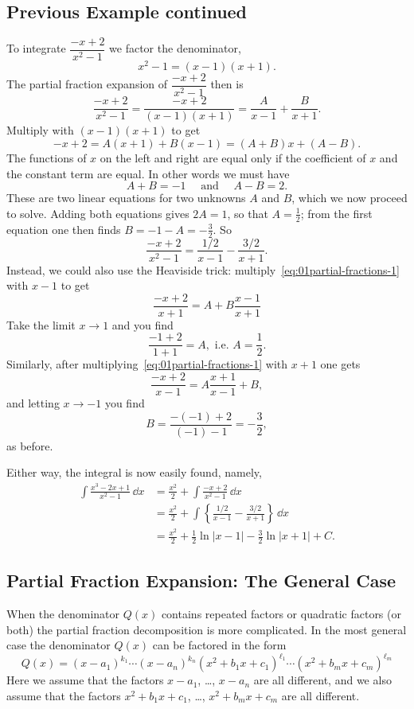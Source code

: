 \subsection{Previous Example continued} %
To integrate $\dfrac{-x+2}{x^2-1}$ we factor the denominator,
\[
x^2 -1 = (x-1) (x+1).
\]
The partial fraction expansion of $\dfrac{-x+2}{x^2-1}$ then is
\begin{equation}
  \frac{-x+2}{x^2-1} =\frac{-x+2}{(x-1) (x+1)} =\frac A{x-1} + \frac B{x+1}.
  \label{eq:01partial-fractions-1}
\end{equation}
Multiply with $(x-1) (x+1)$ to get
\[
-x+2 = A (x+1)+B (x-1) = (A+B) x + (A-B).
\]
The functions of $x$ on the left and right are equal only if the coefficient of
$x$ and the constant term are equal. In other words we must have
\[
A+B = -1 \quad\text{ and }\quad A-B=2.
\]
These are two linear equations for two unknowns $A$ and $B$, which we now
proceed to solve.  Adding both equations gives $2A=1$, so that $A=\frac12$; from
the first equation one then finds $B=-1-A=-\frac32$. So
\[
\frac{-x+2}{x^2-1} = \frac{1/2}{x-1}-\frac{3/2}{x+1}.
\]
Instead, we could also use the Heaviside trick:
multiply~\eqref{eq:01partial-fractions-1} with $x-1$ to get
\[
\frac{-x+2}{x+1} = A+B\frac{x-1}{x+1}
\]
Take the limit $x\to1$ and you find
\[
\frac{-1+2}{1+1}=A, \text{ i.e. } A=\frac12.
\]
Similarly, after multiplying~\eqref{eq:01partial-fractions-1} with $x+1$ one
gets
\[
\frac{-x+2}{x-1}=A\frac{x+1}{x-1} + B,
\]
and letting $x\to-1$ you find
\[
B= \frac{- (-1)+2}{(-1)-1} = -\frac 32,
\]
as before.

Either way, the integral is now easily found, namely,
\begin{align*}
  \int \frac{x^3-2x+1}{x^2-1}\,\dd x
  &=\frac{x^2}{2} +\int  \frac{-x+2}{x^2-1}\,\dd x \\
  &= \frac{x^2}2+\int\left\{\frac{1/2}{x-1}-\frac{3/2}{x+1}\right\}\,\dd x\\
  &=\frac{x^2}2+\frac12\ln|x-1|-\frac32\ln|x+1|+C.
\end{align*}



\subsection{Partial Fraction Expansion: The General Case} %
When the denominator $Q(x)$ contains repeated factors or quadratic factors (or
both) the partial fraction decomposition is more complicated.  In the most
general case the denominator $Q(x)$ can be factored in the form
\begin{equation}\label{eq:Q-yuck}
  Q(x)=(x-a_1)^{k_1}\cdots(x-a_n)^{k_n}(x^2+b_1x+c_1)^{\ell_1}\cdots(x^2+b_mx+c_m)^{\ell_m}
\end{equation}
Here we assume that the factors $x-a_1$, \ldots, $x-a_n$ are all different, and
we also assume that the factors $x^2+b_1x+c_1 $, \ldots, $ x^2+b_mx+c_m$ are all
different.

